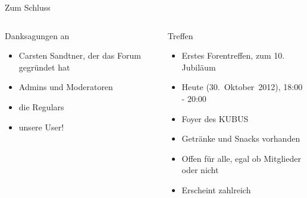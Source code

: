 \documentclass{beamer}
\begin{document}
\begin{frame}{Zum Schluss}
  \begin{columns}[t]
  \begin{block}{Danksagungen an}
    \begin{itemize}
      \item Carsten Sandtner, der das Forum gegründet hat
      \item Admins und Moderatoren
      \item die Regulars
      \item unsere User!
    \end{itemize}
  \end{block}
  \begin{block}{Treffen}
    \begin{itemize}
      \item Erstes Forentreffen, zum 10. Jubiläum
      \item Heute (30.~Oktober~2012), 18:00 - 20:00
      \item Foyer des KUBUS
      \item Getränke und Snacks vorhanden
      \item Offen für alle, egal ob Mitglieder oder nicht
      \item Erscheint zahlreich 
    \end{itemize}
  \end{block}
  \end{columns}
\end{frame}
\end{document}
